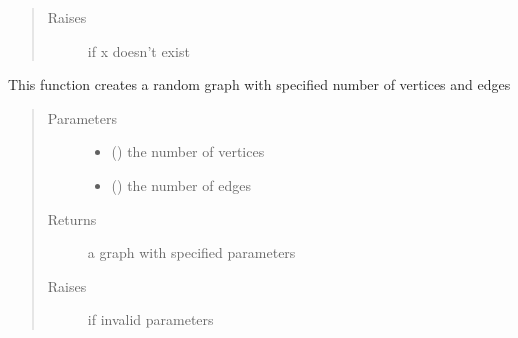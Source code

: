 \documentclass[letterpaper,10pt,english]{sphinxmanual}
\begin{document}
\begin{fulllineitems}
\begin{fulllineitems}
\begin{quote}
\begin{description}
\item[{Raises}] \leavevmode
{} \textendash{} if x doesn’t exist

\end{description}\end{quote}

\end{fulllineitems}


\end{fulllineitems}


\begin{fulllineitems}
\label{\detokenize{Graph:Graph.random_graph}}
This function creates a random graph with specified number of vertices and edges
\begin{quote}\begin{description}
\item[{Parameters}] \leavevmode\begin{itemize}
\item {} 
 () \textendash{} the number of vertices

\item {} 
 () \textendash{} the number of edges

\end{itemize}

\item[{Returns}] \leavevmode
a graph with specified parameters

\item[{Raises}] \leavevmode
{} \textendash{} if invalid parameters

\end{description}\end{quote}

\end{fulllineitems}

\end{document}
